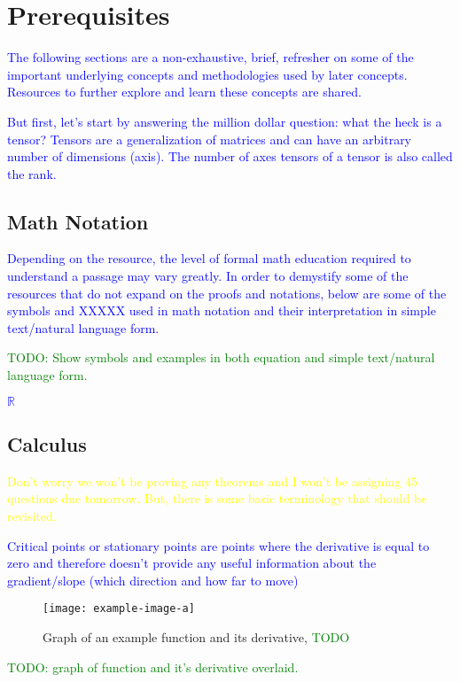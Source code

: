 \chapter{Prerequisites}

\textcolor{blue}{The following sections are a non-exhaustive, brief, refresher on some of the important underlying concepts and methodologies used by later concepts. Resources to further explore and learn these concepts are shared.}

\textcolor{blue}{But first, let's start by answering the million dollar question: what the heck is a tensor?  {Tensors} are a generalization of matrices and can have an arbitrary number of dimensions (axis). The number of axes tensors of a tensor is also called the {rank}.}


\section{Math Notation}

\textcolor{blue}{Depending on the resource, the level of formal math education required to understand a passage may vary greatly. In order to demystify some of the resources that do not expand on the proofs and notations, below are some of the symbols and XXXXX used in math notation and their interpretation in simple text/natural language form.}

\textcolor{green}{TODO: Show symbols and examples in both equation and simple text/natural language form.}

\textcolor{blue}{$\mathbb{R}$}

\section{Calculus}

\textcolor{yellow}{Don't worry we won't be proving any theorems and I won't be assigning 45 questions due tomorrow. But, there is some basic terminology that should be revisited.}

\textcolor{blue}{{Critical points} or {stationary points} are points where the derivative is equal to zero and therefore doesn't provide any useful information about the gradient/slope (which direction and how far to move)}

\begin{figure}
	\centering
	\texttt{[image: example-image-a]}\hfil
	\caption{Graph of an example function and its derivative, \textcolor{green}{TODO}}
	\label{fig:calc_fn_deriv}
\end{figure}
\textcolor{green}{TODO: graph of function and it's derivative overlaid.}


